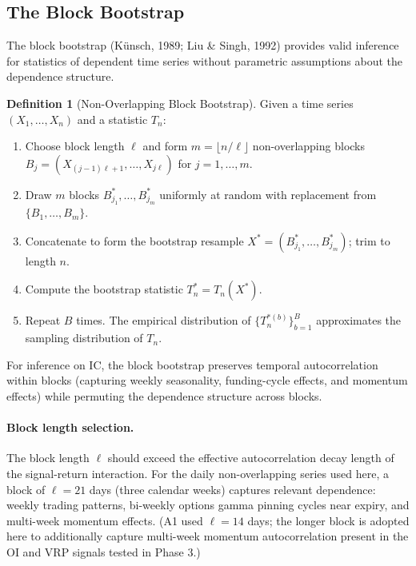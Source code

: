 \documentclass[12pt, a4paper]{article}
\theoremstyle{plain}
\theoremstyle{definition}
\newtheorem{definition}{Definition}[section]
\newcommand{\IC}{\mathrm{IC}}
\begin{document}
\subsection{The Block Bootstrap}
\label{sec:bootstrap}

The block bootstrap (Künsch, 1989; Liu \& Singh, 1992) provides valid inference
for statistics of dependent time series without parametric assumptions about
the dependence structure.

\begin{definition}[Non-Overlapping Block Bootstrap]
  Given a time series $(X_1, \ldots, X_n)$ and a statistic $T_n$:
  \begin{enumerate}
    \item Choose block length $\ell$ and form $m = \lfloor n/\ell \rfloor$
          non-overlapping blocks $B_j = (X_{(j-1)\ell+1}, \ldots, X_{j\ell})$
          for $j = 1, \ldots, m$.
    \item Draw $m$ blocks $B_{j_1}^*, \ldots, B_{j_m}^*$ uniformly at random
          with replacement from $\{B_1, \ldots, B_m\}$.
    \item Concatenate to form the bootstrap resample
          $X^* = (B_{j_1}^*, \ldots, B_{j_m}^*)$; trim to length $n$.
    \item Compute the bootstrap statistic $T_n^* = T_n(X^*)$.
    \item Repeat $B$ times.  The empirical distribution of
          $\{T_n^{*(b)}\}_{b=1}^B$ approximates the sampling distribution
          of $T_n$.
  \end{enumerate}
\end{definition}

For inference on $\IC$, the block bootstrap preserves temporal autocorrelation
within blocks (capturing weekly seasonality, funding-cycle effects, and
momentum effects) while permuting the dependence structure across blocks.

\paragraph{Block length selection.}
The block length $\ell$ should exceed the effective autocorrelation decay
length of the signal-return interaction.  For the daily non-overlapping series
used here, a block of $\ell = 21$ days (three calendar weeks) captures
relevant dependence: weekly trading patterns, bi-weekly options gamma pinning
cycles near expiry, and multi-week momentum effects.  (A1 used $\ell = 14$
days; the longer block is adopted here to additionally capture multi-week
momentum autocorrelation present in the OI and VRP signals tested in Phase 3.)
\end{document}
